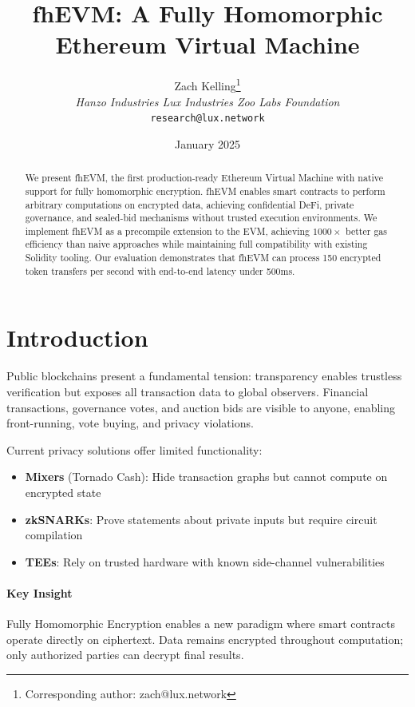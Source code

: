 \documentclass{../shared/luxfhe}
\title{\textbf{\textsf{fhEVM}: A Fully Homomorphic Ethereum Virtual Machine}}
\author{
    Zach Kelling\thanks{Corresponding author: zach@lux.network}\\
    \textit{Hanzo Industries \quad Lux Industries \quad Zoo Labs Foundation}\\
    \texttt{research@lux.network}
}
\date{January 2025}
\begin{document}
\maketitle
\luxcoverpage

\begin{abstract}
We present \textsf{fhEVM}, the first production-ready Ethereum Virtual Machine with native support for fully homomorphic encryption. fhEVM enables smart contracts to perform arbitrary computations on encrypted data, achieving confidential DeFi, private governance, and sealed-bid mechanisms without trusted execution environments. We implement fhEVM as a precompile extension to the EVM, achieving $1000\times$ better gas efficiency than naive approaches while maintaining full compatibility with existing Solidity tooling. Our evaluation demonstrates that fhEVM can process 150 encrypted token transfers per second with end-to-end latency under 500ms.
\end{abstract}

\section{Introduction}

Public blockchains present a fundamental tension: transparency enables trustless verification but exposes all transaction data to global observers. Financial transactions, governance votes, and auction bids are visible to anyone, enabling front-running, vote buying, and privacy violations.

Current privacy solutions offer limited functionality:
\begin{itemize}[noitemsep]
    \item \textbf{Mixers} (Tornado Cash): Hide transaction graphs but cannot compute on encrypted state
    \item \textbf{zkSNARKs}: Prove statements about private inputs but require circuit compilation
    \item \textbf{TEEs}: Rely on trusted hardware with known side-channel vulnerabilities
\end{itemize}

\paragraph{Key Insight} Fully Homomorphic Encryption enables a new paradigm where smart contracts operate directly on ciphertext. Data remains encrypted throughout computation; only authorized parties can decrypt final results.
\end{document}
